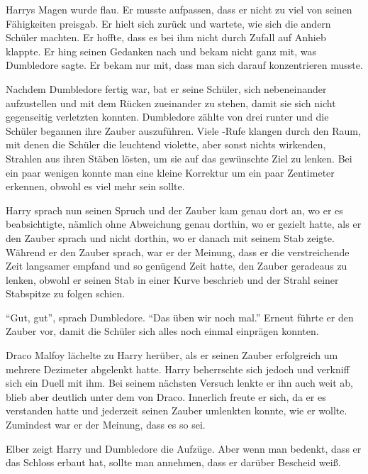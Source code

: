 Harrys Magen wurde flau. Er musste aufpassen, dass er nicht zu viel von seinen Fähigkeiten preisgab. Er hielt sich zurück und wartete, wie sich die andern Schüler machten. Er hoffte, dass es bei ihm nicht durch Zufall auf Anhieb klappte. Er hing seinen Gedanken nach und bekam nicht ganz mit, was Dumbledore sagte. Er bekam nur mit, dass man sich darauf konzentrieren musste.

Nachdem Dumbledore fertig war, bat er seine Schüler, sich nebeneinander aufzustellen und mit dem Rücken zueinander zu stehen, damit sie sich nicht gegenseitig verletzten konnten. Dumbledore zählte von drei runter und die Schüler begannen ihre Zauber auszuführen. Viele -Rufe klangen durch den Raum, mit denen die Schüler die leuchtend violette, aber sonst nichts wirkenden, Strahlen aus ihren Stäben lösten, um sie auf das gewünschte Ziel zu lenken. Bei ein paar wenigen konnte man eine kleine Korrektur um ein paar Zentimeter erkennen, obwohl es viel mehr sein sollte.

Harry sprach nun seinen Spruch und der Zauber kam genau dort an, wo er es beabsichtigte, nämlich ohne Abweichung genau dorthin, wo er gezielt hatte, als er den Zauber sprach und nicht dorthin, wo er danach mit seinem Stab zeigte. Während er den Zauber sprach, war er der Meinung, dass er die verstreichende Zeit langsamer empfand und so genügend Zeit hatte, den Zauber geradeaus zu lenken, obwohl er seinen Stab in einer Kurve beschrieb und der Strahl seiner Stabspitze zu folgen schien.

\enquote{Gut, gut}, sprach Dumbledore. \enquote{Das üben wir noch mal.} Erneut führte er den Zauber vor, damit die Schüler sich alles noch einmal einprägen konnten.

Draco Malfoy lächelte zu Harry herüber, als er seinen Zauber erfolgreich um mehrere Dezimeter abgelenkt hatte. Harry beherrschte sich jedoch und verkniff sich ein Duell mit ihm. Bei seinem nächsten Versuch lenkte er ihn auch weit ab, blieb aber deutlich unter dem von Draco. Innerlich freute er sich, da er es verstanden hatte und jederzeit seinen Zauber umlenkten konnte, wie er wollte. Zumindest war er der Meinung, dass es so sei.




\begin{kommentar}
Elber zeigt Harry und Dumbledore die Aufzüge. Aber wenn man bedenkt, dass er das Schloss erbaut hat, sollte man annehmen, dass er darüber Bescheid weiß.
\end{kommentar}

